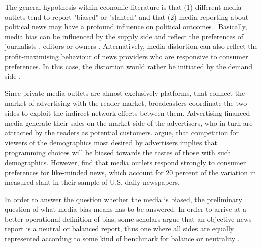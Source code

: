 \documentclass[12pt,a4paper,notitlepage]{article}
\begin{document}
The general hypothesis within economic literature is that (1) different media outlets tend to report "biased" or "slanted" \citep{groseclose_measure_2005, lott_is_2014} and that (2) media reporting about political news may have a profound influence on political outcomes \citep{gentzkow_media_2004, stromberg_radios_2004, dellavigna_fox_2006, snyder_press_2010, gentzkow_television_2006}. Basically, media bias can be influenced by the supply side and reflect the preferences of journalists \citep{baron_persistent_2006}, editors or owners \citep{besley_handcuffs_2006}. Alternatively, media distortion can also reflect the profit-maximising behaviour of news providers who are responsive to consumer preferences. In this case, the distortion would rather be initiated by the demand side \citep{mullainathan_market_2005, gentzkow_media_2006, suen_self-perpetuation_2004}. 

Since private media outlets are almost exclusively platforms, that connect the market of advertising with the reader market, broadcasters coordinate the two sides to exploit the indirect network effects between them. Advertising-financed media generate their sales on the market side of the advertisers, who in turn are attracted by the readers as potential customers. \citet{anderson_media_2006} argue, that competition for viewers of the demographics most desired by advertisers implies that programming choices will be biased towards the tastes of those with such demographics. However, \citet{gentzkow_what_2010} find that media outlets respond strongly to consumer preferences for like-minded news, which account for 20 percent of the variation in measured slant in their sample of U.S. daily newspapers.

In order to answer the question whether the media is biased, the preliminary question of what media bias means has to be answered. In order to arrive at a better operational definition of bias, some scholars argue that an objective news report is a neutral or balanced report, thus one where all sides are equally represented according to some kind of benchmark for balance or neutrality \citep{eberl_one_2017}. 
\end{document}
